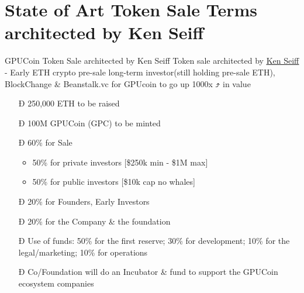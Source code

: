 \documentclass[10pt,handout]{beamer}
\begin{document}
\section{State of Art Token Sale Terms architected by Ken Seiff}
\begin{frame}[fragile]{GPUCoin Token Sale architected by Ken Seiff}
Token sale architected by \href{https://beanstalk.vc/}{\underline{Ken Seiff}} - Early ETH crypto pre-sale long-term investor(still holding pre-sale ETH), BlockChange \& Beanstalk.vc for GPUcoin to go up 1000x ⤴ in value


 \begin{itemize}[<+-| alert@+>]%

\item[Ð]{250,000 ETH to be raised}
\item[Ð]100M GPUCoin (GPC) to be minted
\item[Ð]60\% for Sale
\begin{itemize}[<+-| alert@+>]
\item 50\% for private investors [\$250k min - \$1M max]
\item 50\% for public investors [\$10k cap no whales]
\end{itemize}
\item[Ð]{20\% for Founders, Early Investors}
\item[Ð]{20\% for the Company \& the foundation}
\item[Ð]{Use of funds: 50\% for the first reserve; 30\% for development; 10\% for the legal/marketing; 10\% for operations}
\item[Ð]{Co/Foundation will do an Incubator \& fund to support the GPUCoin ecosystem companies}
\end{itemize}

\end{frame}
\end{document}
